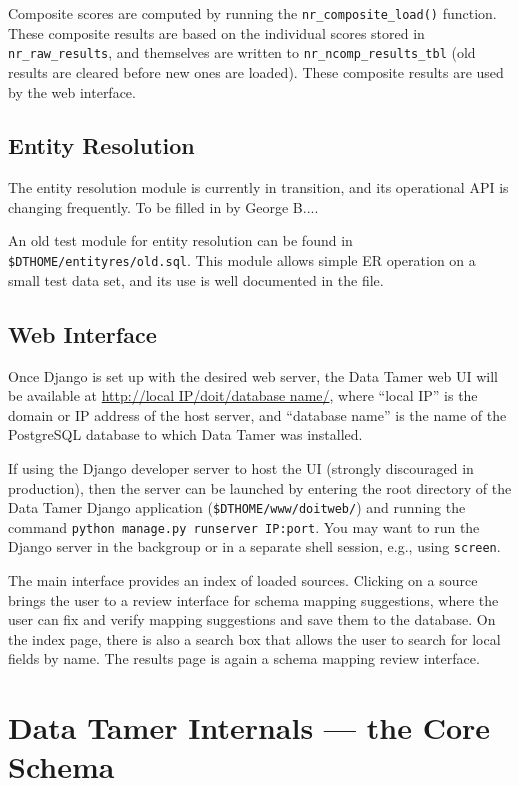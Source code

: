 Composite scores are computed by running the \texttt{nr\_composite\_load()} function.  These composite results are based on the individual scores stored in \texttt{nr\_raw\_results}, and themselves are written to \texttt{nr\_ncomp\_results\_tbl} (old results are cleared before new ones are loaded).  These composite results are used by the web interface.


\subsection{Entity Resolution}

The entity resolution module is currently in transition, and its operational API is changing frequently.  To be filled in by George B....

An old test module for entity resolution can be found in \texttt{\$DTHOME/entityres/old.sql}.  This module allows simple ER operation on a small test data set, and its use is well documented in the file.


\subsection{Web Interface}

Once Django is set up with the desired web server, the Data Tamer web UI will be available at \url{http://local IP/doit/database name/}, where ``local IP'' is the domain or IP address of the host server, and ``database name'' is the name of the PostgreSQL database to which Data Tamer was installed.

If using the Django developer server to host the UI (strongly discouraged in production), then the server can be launched by entering the root directory of the Data Tamer Django application (\texttt{\$DTHOME/www/doitweb/}) and running the command \texttt{python manage.py runserver IP:port}.  You may want to run the Django server in the backgroup or in a separate shell session, e.g., using \texttt{screen}.

The main interface provides an index of loaded sources.  Clicking on a source brings the user to a review interface for schema mapping suggestions, where the user can fix and verify mapping suggestions and save them to the database.  On the index page, there is also a search box that allows the user to search for local fields by name.  The results page is again a schema mapping review interface.


\section{Data Tamer Internals --- the Core Schema}

